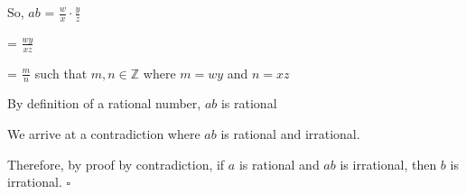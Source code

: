 \documentclass{article} %
\begin{document}
    So, $ab$ = $\frac{w}{x} \cdot \frac{y}{z}$ 
    
    \vspace*{0.1cm}

    \tabto*{1.55cm} = $\frac{wy}{xz}$

    \vspace*{0.1cm}

    \tabto*{1.55cm} = $\frac{m}{n}$ such that $m, n \in \mathbb{Z}$ where $m = wy$ and $n = xz$

    By definition of a rational number, $ab$ is rational

    We arrive at a contradiction where $ab$ is rational and irrational.

    Therefore, by proof by contradiction, if $a$ is rational and $ab$ is irrational, then $b$ is irrational. $\square$




    





    
\end{document}
